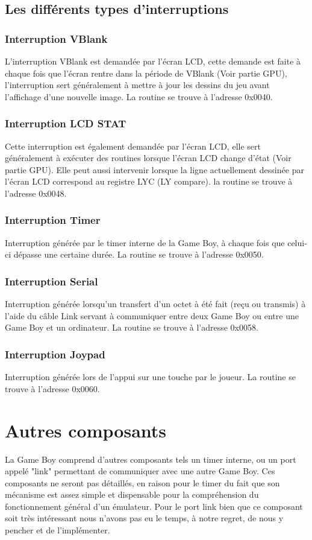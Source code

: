 \documentclass{report}
\begin{document}
\subsection{Les différents types d'interruptions}
\subsubsection{Interruption VBlank}
L'interruption VBlank est demandée par l'écran LCD, cette demande est faite à chaque fois que l'écran rentre dans la période de VBlank (Voir partie GPU), l'interruption sert généralement à mettre à jour les dessins du jeu avant l'affichage d'une nouvelle image. La routine se trouve à l'adresse 0x0040.
\subsubsection{Interruption LCD STAT}
Cette interruption est également demandée par l'écran LCD, elle sert généralement à exécuter des routines lorsque l'écran LCD change d'état (Voir partie GPU). Elle peut aussi intervenir lorsque la ligne actuellement dessinée par l'écran LCD correspond au registre LYC (LY compare). la routine se trouve à l'adresse 0x0048.
\subsubsection{Interruption Timer}
Interruption générée par le timer interne de la Game Boy, à chaque fois que celui-ci dépasse une certaine durée. La routine se trouve à l'adresse 0x0050.
\subsubsection{Interruption Serial}
Interruption générée lorsqu'un transfert d'un octet à été fait (reçu ou transmis) à l'aide du câble Link servant à communiquer entre deux Game Boy ou entre une Game Boy et un ordinateur. La routine se trouve à l'adresse 0x0058.
\subsubsection{Interruption Joypad}
Interruption générée lors de l'appui sur une touche par le joueur. La routine se trouve à l'adresse 0x0060.
\section{Autres composants}
La Game Boy comprend d'autres composants tels un timer interne, ou un port appelé "link" permettant de communiquer avec une autre Game Boy. Ces composants ne seront pas détaillés, en raison pour le timer du fait que son mécanisme est assez simple et dispensable pour la compréhension du fonctionnement général d'un émulateur. Pour le port link bien que ce composant soit très intéressant nous n'avons pas eu le temps, à notre regret, de nous y pencher et de l'implémenter.
\end{document}
